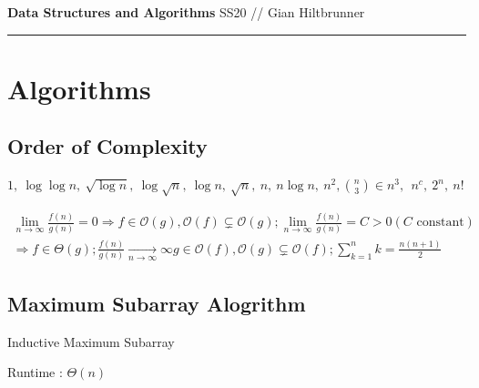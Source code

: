 \documentclass[10pt,landscape,a4paper, table]{extarticle}
\begin{document}
\begin{multicols*}{3}
\raggedright

\large{\textbf{Data Structures and Algorithms} SS20} // \normalsize{Gian Hiltbrunner\hspace{0.5cm}}\vspace{0.1cm}\hrule

\setlength{\parindent}{0pt}
\setlength{\parskip}{1pt}
\setlength{\abovedisplayskip}{0pt}
\setlength{\belowdisplayskip}{0pt}
\setlength{\abovedisplayshortskip}{0pt}
\setlength{\belowdisplayshortskip}{0pt}


\section{Algorithms}

\subsection{Order of Complexity}
\begin{center}
{\tiny
$1,\ \log\log n,\ \sqrt{\log n},\ \log\sqrt{n},\ \log n,\ \sqrt{n},\ n,\ n\log n,\ n^2,\binom{n}{3} \in n^3,\ \ n^c,\  2^n,\ n!$
}
\end{center}
{\tiny
\begin{align*}
    \lim _{n\rightarrow\infty}\frac{f(n)}{g(n)} = 0 \Rightarrow f \in \mathcal{O}(g), \mathcal{O}(f) \subsetneq \mathcal{O}(g); \lim _{n\rightarrow\infty}\frac{f(n)}{g(n)} = C > 0 (C \text{ constant}) \\ \Rightarrow f \in \Theta (g); \frac{f(n)}{g(n)} \underset{n\rightarrow\infty}{\rightarrow} \infty g \in \mathcal{O}(f), \mathcal{O}(g) \subsetneq \mathcal{O}(f);
    \sum_{k=1}^n k = \frac{n(n+1)}{2}
\end{align*}}

\subsection{Maximum Subarray Alogrithm}

{\scriptsize
\begin{algorithm}[H]
    \caption{Inductive Maximum Subarray}
    \label{FWAlgorithm}
    \SetAlgoLined
\end{algorithm}}
Runtime : $\Theta(n)$

\end{multicols*}
\end{document}
